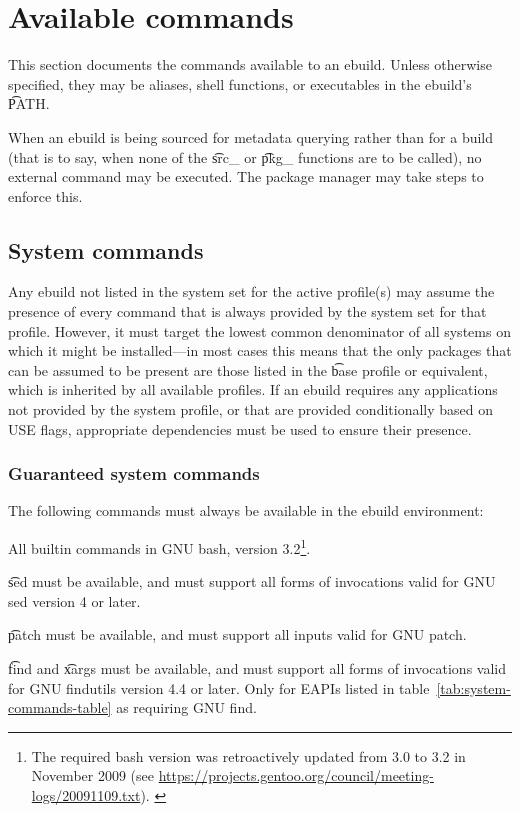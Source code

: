 \section{Available commands}
\label{sec:ebuild-env-commands}

This section documents the commands available to an ebuild. Unless otherwise specified, they may be
aliases, shell functions, or executables in the ebuild's \t{PATH}.

When an ebuild is being sourced for metadata querying rather than for a build (that is to say,
when none of the \t{src\_} or \t{pkg\_} functions are to be called), no external command may
be executed. The package manager may take steps to enforce this.

\subsection{System commands}

Any ebuild not listed in the system set for the active profile(s) may assume the presence of every
command that is always provided by the system set for that profile. However, it must target the
lowest common denominator of all systems on which it might be installed---in most cases this means
that the only packages that can be assumed to be present are those listed in the \t{base} profile or
equivalent, which is inherited by all available profiles. If an ebuild requires any applications not
provided by the system profile, or that are provided conditionally based on USE flags, appropriate
dependencies must be used to ensure their presence.

\subsubsection{Guaranteed system commands}
\label{sec:guaranteed-system-commands}

The following commands must always be available in the ebuild environment:
\begin{compactitem}
\item All builtin commands in GNU bash, version 3.2\footnote{The required bash version was
    retroactively updated from 3.0 to 3.2 in November 2009
    (see \url{https://projects.gentoo.org/council/meeting-logs/20091109.txt}).%
    \label{fn:bash3.2}}.
\item \t{sed} must be available, and must support all forms of invocations valid for GNU sed
    version 4 or later.
\item \t{patch} must be available, and must support all inputs valid for GNU patch.
\item {} \t{find} and \t{xargs} must be available, and must support all forms
    of invocations valid for GNU findutils version 4.4 or later. Only for EAPIs listed in
    table~\ref{tab:system-commands-table} as requiring GNU find.
\end{compactitem}

